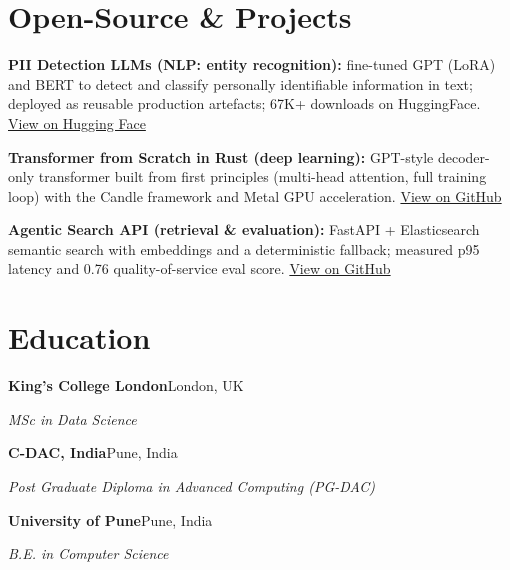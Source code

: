 \documentclass[10pt,a4paper]{article}
\begin{document}
\section{Open-Source \& Projects}
\begin{tight}
  \item \textbf{PII Detection LLMs (NLP: entity recognition):} fine-tuned GPT (LoRA) and BERT to detect and classify personally identifiable information in text; deployed as reusable production artefacts; 67K+ downloads on HuggingFace. \href{https://huggingface.co/ab-ai/pii_model}{View on Hugging Face}
  \item \textbf{Transformer from Scratch in Rust (deep learning):} GPT-style decoder-only transformer built from first principles (multi-head attention, full training loop) with the Candle framework and Metal GPU acceleration. \href{https://github.com/abhijeetscode/transformer-rust}{View on GitHub}
  \item \textbf{Agentic Search API (retrieval \& evaluation):} FastAPI + Elasticsearch semantic search with embeddings and a deterministic fallback; measured p95 latency and 0.76 quality-of-service eval score. \href{https://github.com/abhijeetscode/search-agent}{View on GitHub}
\end{tight}

\section{Education}
{\color{company}\bfseries King's College London}\hfill {\color{muted}London, UK}\par
{\itshape MSc in Data Science}\par\vspace{2pt}
{\color{company}\bfseries C-DAC, India}\hfill {\color{muted}Pune, India}\par
{\itshape Post Graduate Diploma in Advanced Computing (PG-DAC)}\par\vspace{2pt}
{\color{company}\bfseries University of Pune}\hfill {\color{muted}Pune, India}\par
{\itshape B.E. in Computer Science}\par
\end{document}
